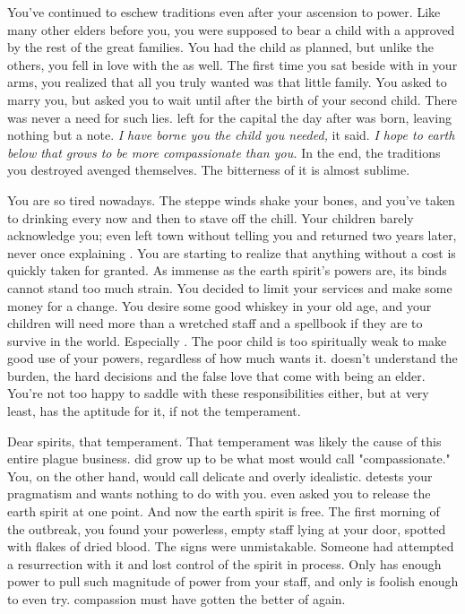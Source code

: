 \documentclass[char]{Pestilence}
\begin{document}
You've continued to eschew traditions even after your ascension to power. Like many other elders before you, you were supposed to bear a child with a \cElderSpouse{\human} approved by the rest of the great families. You had the child as planned, but unlike the others, you fell in love with the \cElderSpouse{\human} as well. The first time you sat beside \cElderSpouse{\intro} with \cApprentice{} in your arms, you realized that all you truly wanted was that little family. You asked \cElderSpouse{\them} to marry you, but \cElderSpouse{\they} asked you to wait until after the birth of your second child. There was never a need for such lies. \cElderSpouse{} left for the capital the day after \cRebel{} was born, leaving nothing but a note. \textit{I have borne you the child you needed,} it said. \textit{I hope to earth below that \cRebel{\they} grows to be more compassionate than you.} In the end, the traditions you destroyed avenged themselves. The bitterness of it is almost sublime.

You are so tired nowadays. The steppe winds shake your bones, and you've taken to drinking every now and then to stave off the chill. Your children barely acknowledge you; \cApprentice{} even left town without telling you and returned two years later, never once explaining \cApprentice{\themself}. You are starting to realize that anything without a cost is quickly taken for granted. As immense as the earth spirit's powers are, its binds cannot stand too much strain. You decided to limit your services and make some money for a change. You desire some good whiskey in your old age, and your children will need more than a wretched staff and a spellbook if they are to survive in the world. Especially \cApprentice{}. The poor child is too spiritually weak to make good use of your powers, regardless of how much \cApprentice{\they} wants it. \cApprentice{\They} doesn't understand the burden, the hard decisions and the false love that come with being an elder. You're not too happy to saddle \cRebel{} with these responsibilities either, but at very least, \cRebel{\they} has the aptitude for it, if not the temperament.

Dear spirits, that temperament. That temperament was likely the cause of this entire plague business. \cRebel{} did grow up to be what most would call "compassionate." You, on the other hand, would call \cRebel{\them} delicate and overly idealistic. \cRebel{} detests your pragmatism and wants nothing to do with you. \cRebel{\They} even asked you to release the earth spirit at one point. And now the earth spirit is free. The first morning of the outbreak, you found your powerless, empty staff lying at your door, spotted with flakes of dried blood. The signs were unmistakable. Someone had attempted a resurrection with it and lost control of the spirit in process. Only \cRebel{} has enough power to pull such magnitude of power from your staff, and only \cRebel{\they} is foolish enough to even try. \cRebel{\Their} compassion must have gotten the better of \cRebel{\them} again. 
\end{document}
